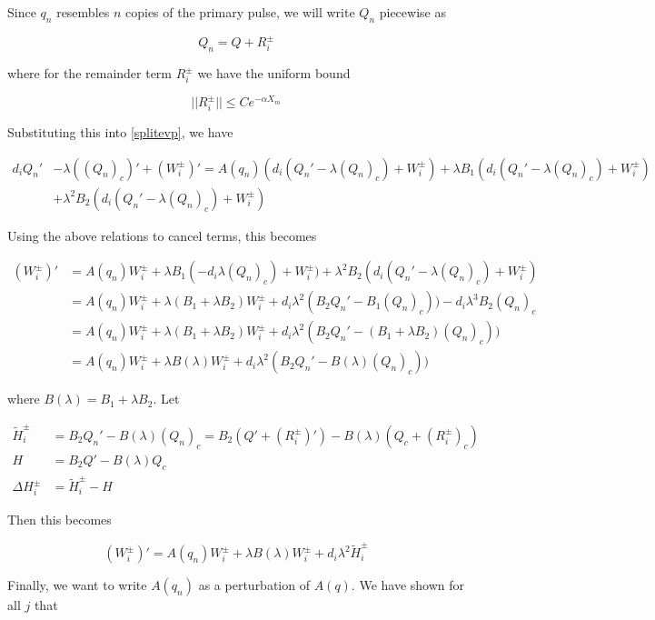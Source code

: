 \documentclass[12pt]{article}
\begin{document}
Since $q_n$ resembles $n$ copies of the primary pulse, we will write $Q_n$ piecewise as

\[
Q_n = Q + R_i^\pm
\]

where for the remainder term $R_i^\pm$ we have the uniform bound

\[
||R_i^\pm|| \leq C e^{-\alpha X_m}
\]

Substituting this into \eqref{splitevp}, we have

\begin{align*}
d_i Q_n' &- \lambda ((Q_n)_c)' + (W_i^\pm)' = A(q_n)(d_i (Q_n' - \lambda (Q_n)_c) + W_i^\pm) + \lambda B_1(d_i (Q_n' - \lambda (Q_n)_c) + W_i^\pm) \\
&+ \lambda^2 B_2 (d_i (Q_n' - \lambda (Q_n)_c) + W_i^\pm)
\end{align*}

Using the above relations to cancel terms, this becomes

\begin{align*}
(W_i^\pm)' &= A(q_n) W_i^\pm + \lambda B_1(-d_i \lambda (Q_n)_c) + W_i^\pm) 
+ \lambda^2 B_2 (d_i (Q_n' - \lambda (Q_n)_c) + W_i^\pm) \\
&= A(q_n) W_i^\pm + \lambda (B_1 + \lambda B_2) W_i^\pm 
+ d_i \lambda^2(B_2 Q_n' - B_1 (Q_n)_c)) - d_i \lambda^3 B_2 (Q_n)_c \\
&= A(q_n) W_i^\pm + \lambda (B_1 + \lambda B_2) W_i^\pm 
+ d_i \lambda^2(B_2 Q_n' - (B_1 + \lambda B_2)(Q_n)_c)) \\
&= A(q_n) W_i^\pm + \lambda B(\lambda) W_i^\pm 
+ d_i \lambda^2(B_2 Q_n' - B(\lambda)(Q_n)_c))
\end{align*}

where $B(\lambda) = B_1 + \lambda B_2$. Let

\begin{align*}
\tilde{H}_i^\pm &= B_2 Q_n' - B(\lambda)(Q_n)_c 
= B_2 (Q' + (R_i^\pm)') - B(\lambda)(Q_c + (R_i^\pm)_c) \\
H &= B_2 Q' - B(\lambda)Q_c \\
\Delta H_i^\pm &= \tilde{H}_i^\pm - H
\end{align*}

Then this becomes

\begin{equation}
(W_i^\pm)' = A(q_n) W_i^\pm + \lambda B(\lambda) W_i^\pm 
+ d_i \lambda^2 \tilde{H}_i^\pm
\end{equation}

Finally, we want to write $A(q_n)$ as a perturbation of $A(q)$. We have shown for all $j$ that
\end{document}
